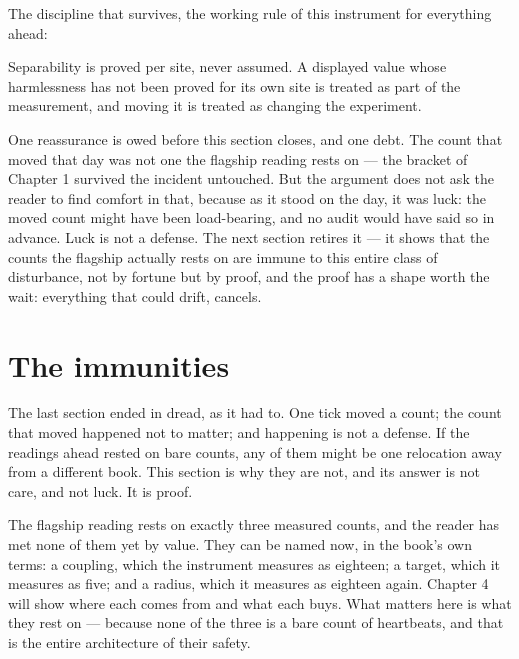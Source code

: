 The discipline that survives, the working rule of this instrument for everything
ahead:

\begin{fence}
Separability is proved per site, never assumed. A displayed value whose harmlessness
has not been proved for its own site is treated as part of the measurement, and moving
it is treated as changing the experiment.
\end{fence}

One reassurance is owed before this section closes, and one debt. The count that moved
that day was not one the flagship reading rests on --- the bracket of Chapter 1
survived the incident untouched. But the argument does not ask the reader to find
comfort in that, because as it stood on the day, it was luck: the moved count might
have been load-bearing, and no audit would have said so in advance. Luck is not a
defense. The next section retires it --- it shows that the counts the flagship actually
rests on are immune to this entire class of disturbance, not by fortune but by proof,
and the proof has a shape worth the wait: everything that could drift, cancels.

\section{The immunities}

The last section ended in dread, as it had to. One tick moved a count; the count that
moved happened not to matter; and happening is not a defense. If the readings ahead
rested on bare counts, any of them might be one relocation away from a different book.
This section is why they are not, and its answer is not care, and not luck. It is
proof.

The flagship reading rests on exactly three measured counts, and the reader has met
none of them yet by value. They can be named now, in the book's own terms: a coupling,
which the instrument measures as eighteen; a target, which it measures as five; and a
radius, which it measures as eighteen again. Chapter 4 will show where each comes from
and what each buys. What matters here is what they rest on --- because none of the
three is a bare count of heartbeats, and that is the entire architecture of their
safety.

